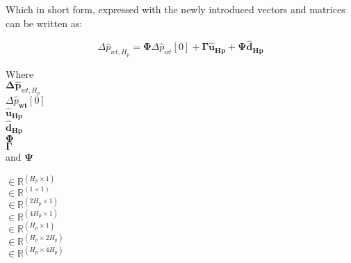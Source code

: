 Which in short form, expressed with the newly introduced vectors and matrices can be written as: 

\begin{equation}
	\Delta \hat{p}_{wt,H_p} = \bm{\Phi} \Delta \hat{p}_{wt}[0] + \bm{\Gamma} \bm{\hat{u}}_{\bm{Hp}} + \bm{\Psi} \bm{\hat{d}}_{\bm{Hp}}
	\label{extendedmatrix}
\end{equation}

\begin{minipage}[t]{0.15\textwidth}
Where\\
\hspace*{8mm} $\bm{\Delta \hat{p}}_{wt,H_p} $ \\\newline
\hspace*{8mm} $\Delta \hat{p}_{\bm{wt}}[0] $ \\\newline
\hspace*{8mm} $\bm{\hat{u}_{\bm{Hp}}}$ \\\newline
\hspace*{8mm} $\bm{\hat{d}_{\bm{Hp}}}$ \\\newline
\hspace*{8mm} $\bm{\Phi}$ \\\newline
\hspace*{8mm} $\bm{\Gamma}$ \\\newline
and \hspace*{0.7mm} $\bm{\Psi} $ 
\end{minipage}
\begin{minipage}[t]{0.13\textwidth}
\vspace*{2mm}
$\in \pmb{\mathbb{R}}^{(H_p \times 1)}$ \\\newline
$\in \mathbb{R}^{(1 \times 1)}$ \\\newline
$\in \pmb{\mathbb{R}}^{(2 H_p \times 1)}$ \\\newline
$\in \pmb{\mathbb{R}}^{(4 H_p \times 1)}$ \\\newline
$\in \pmb{\mathbb{R}}^{(H_p \times 1)}$ \\\newline
$\in \pmb{\mathbb{R}}^{(H_p \times 2 H_p)}$ \\\newline
$\in \pmb{\mathbb{R}}^{(H_p \times 4 H_p)}$ 
\end{minipage}
